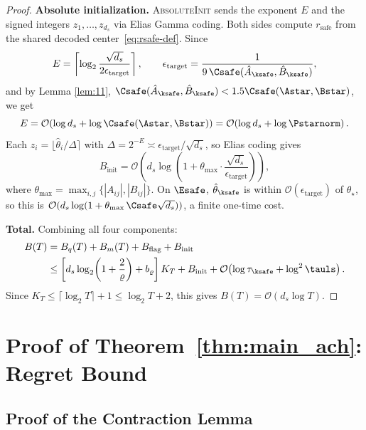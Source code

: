 \documentclass[11pt,journal,onecolumn]{IEEEtran}
\newcommand{\safe}{\mathrm{safe}}
\begin{document}
\begin{proof}
\medskip\noindent\textbf{Absolute initialization.}
\textsc{AbsoluteInit} sends the exponent $E$ and the signed integers $z_1,\dots,z_{d_s}$ via Elias Gamma coding. Both sides compute $r_\safe$ from the shared decoded center~\eqref{eq:rsafe-def}. Since
\[
    E = \left\lceil \log_2 \frac{\sqrt{d_s}}{2\epsilon_{\mathrm{target}}} \right\rceil, \qquad \epsilon_{\mathrm{target}} = \frac{1}{9\,\Csafe(\hat A_{\ksafe}, \hat B_{\ksafe})},
\]
and by Lemma \ref{lem:11}, $\Csafe(\hat A_{\ksafe}, \hat B_{\ksafe}) < 1.5 \Csafe(\Astar, \Bstar)$, we get
\[
    E = \mathcal{O}\!\left(\log d_s + \log \Csafe(\Astar, \Bstar)\right) = \mathcal{O}\!\left(\log d_s + \log \Pstarnorm\right).
\]
Each $z_i = \lfloor \hat\theta_i / \Delta \rceil$ with $\Delta = 2^{-E} \asymp \epsilon_{\mathrm{target}} / \sqrt{d_s}$, so Elias coding gives
\begin{equation}\label{eq:Binit}
    B_{\mathrm{init}} = \mathcal{O}\!\left(d_s \log\!\left(1 + \theta_{\max} \cdot \frac{\sqrt{d_s}}{\epsilon_{\mathrm{target}}}\right)\right),
\end{equation}
where $\theta_{\max} = \max_{i,j}\{|A_{ij}|, |B_{ij}|\}$. On $\Esafe$, $\hat\theta_{\ksafe}$ is within $\mathcal{O}(\epsilon_{\mathrm{target}})$ of $\theta_\star$, so this is $\mathcal{O}(d_s \log(1 + \theta_{\max}\, \Csafe \sqrt{d_s}))$, a finite one-time cost.

\medskip\noindent\textbf{Total.}
Combining all four components:
\begin{align}
    B(T) &= B_q(T) + B_m(T) + B_{\mathrm{flag}} + B_{\mathrm{init}} \nonumber \\
    &\le \left[d_s \log_2\!\left(1 + \frac{2}{\varrho}\right) + b_\varrho\right] K_T + B_{\mathrm{init}} + \mathcal{O}\!\left(\log \tau_{\ksafe} + \log^2 \tauls\right). \label{eq:total-bits-proof}
\end{align}
Since $K_T \le \lceil \log_2 T \rceil + 1 \le \log_2 T + 2$, this gives $B(T) = \mathcal{O}(d_s \log T)$.
\end{proof}

\section{Proof of Theorem~\ref{thm:main_ach}: Regret Bound}
\label{app:achievability}

\subsection{Proof of the Contraction Lemma}
\end{document}
